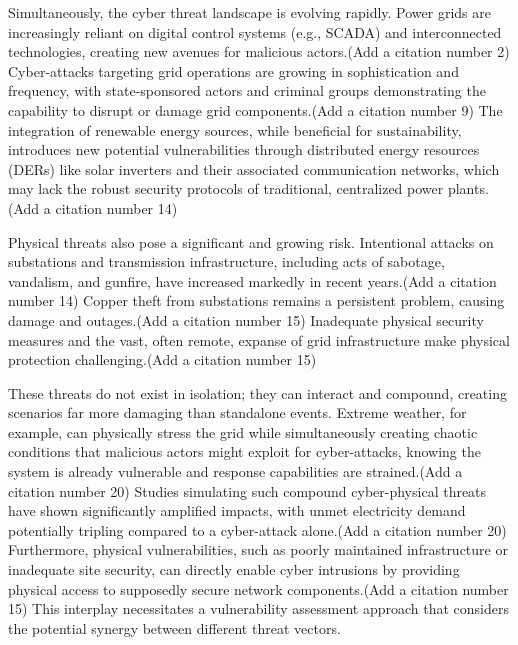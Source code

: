 \documentclass[10pt,twocolumn,letterpaper]{article}
\begin{document}
Simultaneously, the cyber threat landscape is evolving rapidly. Power grids are increasingly reliant on digital control systems (e.g., SCADA) and interconnected technologies, creating new avenues for malicious actors.(Add a citation number 2) Cyber-attacks targeting grid operations are growing in sophistication and frequency, with state-sponsored actors and criminal groups demonstrating the capability to disrupt or damage grid components.(Add a citation number 9) The integration of renewable energy sources, while beneficial for sustainability, introduces new potential vulnerabilities through distributed energy resources (DERs) like solar inverters and their associated communication networks, which may lack the robust security protocols of traditional, centralized power plants.(Add a citation number 14)

Physical threats also pose a significant and growing risk. Intentional attacks on substations and transmission infrastructure, including acts of sabotage, vandalism, and gunfire, have increased markedly in recent years.(Add a citation number 14) Copper theft from substations remains a persistent problem, causing damage and outages.(Add a citation number 15) Inadequate physical security measures and the vast, often remote, expanse of grid infrastructure make physical protection challenging.(Add a citation number 15)

These threats do not exist in isolation; they can interact and compound, creating scenarios far more damaging than standalone events. Extreme weather, for example, can physically stress the grid while simultaneously creating chaotic conditions that malicious actors might exploit for cyber-attacks, knowing the system is already vulnerable and response capabilities are strained.(Add a citation number 20) Studies simulating such compound cyber-physical threats have shown significantly amplified impacts, with unmet electricity demand potentially tripling compared to a cyber-attack alone.(Add a citation number 20) Furthermore, physical vulnerabilities, such as poorly maintained infrastructure or inadequate site security, can directly enable cyber intrusions by providing physical access to supposedly secure network components.(Add a citation number 15) This interplay necessitates a vulnerability assessment approach that considers the potential synergy between different threat vectors.
\end{document}
